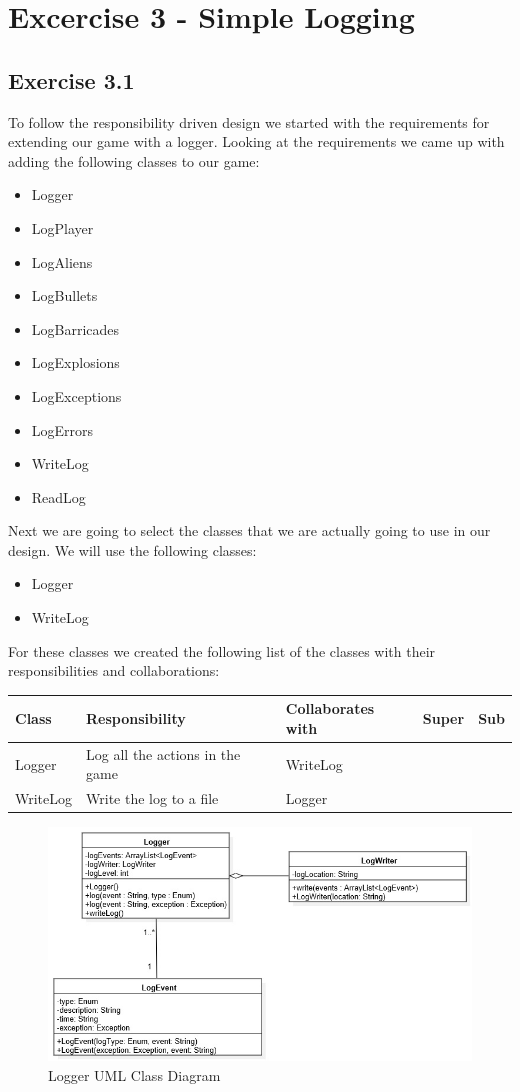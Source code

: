 \documentclass[10pt]{article}
\begin{document}
\pagebreak
\section*{Excercise 3 - Simple Logging}
\subsection{Exercise 3.1}

To follow the responsibility driven design we started with the requirements for extending our game with a logger.
Looking at the requirements we came up with adding the following classes to our game:
\begin{itemize}
\item Logger
\item LogPlayer
\item LogAliens
\item LogBullets
\item LogBarricades
\item LogExplosions
\item LogExceptions
\item LogErrors
\item WriteLog
\item ReadLog
\end{itemize}

Next we are going to select the classes that we are actually going to use in our design. We will use the following classes:
\begin{itemize}
\item Logger
\item WriteLog
\end{itemize}

For these classes we created the following list of the classes with their responsibilities and collaborations:
\begin{center}
   \hspace*{-0.75in}\begin{tabular}{ | p{3cm} | p{5cm} | p{3cm} | p{2cm} | p{2cm} |}
  \hline
  Class & Responsibility & Collaborates with & Super & Sub \\ \hline
  Logger & Log all the actions in the game & WriteLog & & \\ \hline
  WriteLog & Write the log to a file & Logger & & \\ \hline
    \end{tabular}
\end{center}

\begin{figure}[ht!]
\includegraphics[width=1.1\textwidth]{LoggerUML.jpg}
\caption{Logger UML Class Diagram}
\end{figure}
\end{document}
